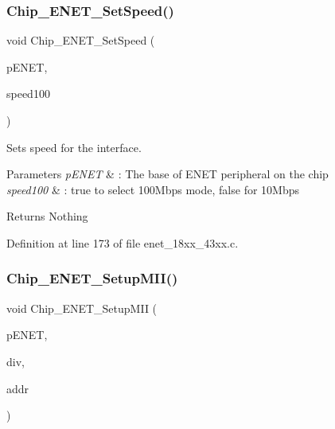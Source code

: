 \subsubsection{\texorpdfstring{Chip\+\_\+\+E\+N\+E\+T\+\_\+\+Set\+Speed()}{Chip\_ENET\_SetSpeed()}}
{\footnotesize\ttfamily void Chip\+\_\+\+E\+N\+E\+T\+\_\+\+Set\+Speed (\begin{DoxyParamCaption}\item[{\hyperlink{struct_l_p_c___e_n_e_t___t}{L\+P\+C\+\_\+\+E\+N\+E\+T\+\_\+T} $\ast$}]{p\+E\+N\+ET,  }\item[{bool}]{speed100 }\end{DoxyParamCaption})}



Sets speed for the interface. 


\begin{DoxyParams}{Parameters}
{\em p\+E\+N\+ET} & \+: The base of E\+N\+ET peripheral on the chip \\
\hline
{\em speed100} & \+: true to select 100\+Mbps mode, false for 10\+Mbps \\
\hline
\end{DoxyParams}
\begin{DoxyReturn}{Returns}
Nothing 
\end{DoxyReturn}


Definition at line 173 of file enet\+\_\+18xx\+\_\+43xx.\+c.

\mbox{\label{group___e_n_e_t__18_x_x__43_x_x_ga9694421dbd0f331895fcf514fd18c938}} 
\subsubsection{\texorpdfstring{Chip\+\_\+\+E\+N\+E\+T\+\_\+\+Setup\+M\+I\+I()}{Chip\_ENET\_SetupMII()}}
{\footnotesize\ttfamily void Chip\+\_\+\+E\+N\+E\+T\+\_\+\+Setup\+M\+II (\begin{DoxyParamCaption}\item[{\hyperlink{struct_l_p_c___e_n_e_t___t}{L\+P\+C\+\_\+\+E\+N\+E\+T\+\_\+T} $\ast$}]{p\+E\+N\+ET,  }\item[{uint32\+\_\+t}]{div,  }\item[{uint8\+\_\+t}]{addr }\end{DoxyParamCaption})}



